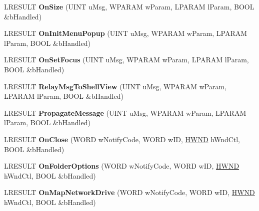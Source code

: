 \begin{DoxyCompactItemize}
\mbox{\label{class_c_shell_browser_a8113e7d49a1ada433d2da04ef61cdff5}} 
L\+R\+E\+S\+U\+LT {\bfseries On\+Size} (U\+I\+NT u\+Msg, W\+P\+A\+R\+AM w\+Param, L\+P\+A\+R\+AM l\+Param, B\+O\+OL \&b\+Handled)
\item 
\mbox{\label{class_c_shell_browser_a6589f68ce060ff00ac2c335e058afdd8}} 
L\+R\+E\+S\+U\+LT {\bfseries On\+Init\+Menu\+Popup} (U\+I\+NT u\+Msg, W\+P\+A\+R\+AM w\+Param, L\+P\+A\+R\+AM l\+Param, B\+O\+OL \&b\+Handled)
\item 
\mbox{\label{class_c_shell_browser_a10d29ee069f0155f98ed3edd4bb272ca}} 
L\+R\+E\+S\+U\+LT {\bfseries On\+Set\+Focus} (U\+I\+NT u\+Msg, W\+P\+A\+R\+AM w\+Param, L\+P\+A\+R\+AM l\+Param, B\+O\+OL \&b\+Handled)
\item 
\mbox{\label{class_c_shell_browser_a0c4efee29288d5938c346fee8cceb997}} 
L\+R\+E\+S\+U\+LT {\bfseries Relay\+Msg\+To\+Shell\+View} (U\+I\+NT u\+Msg, W\+P\+A\+R\+AM w\+Param, L\+P\+A\+R\+AM l\+Param, B\+O\+OL \&b\+Handled)
\item 
\mbox{\label{class_c_shell_browser_a8d00a384e805fb8dcb4e99f5ace18569}} 
L\+R\+E\+S\+U\+LT {\bfseries Propagate\+Message} (U\+I\+NT u\+Msg, W\+P\+A\+R\+AM w\+Param, L\+P\+A\+R\+AM l\+Param, B\+O\+OL \&b\+Handled)
\item 
\mbox{\label{class_c_shell_browser_ab0f76de58d8dcbfe60ca5293dbe931e1}} 
L\+R\+E\+S\+U\+LT {\bfseries On\+Close} (W\+O\+RD w\+Notify\+Code, W\+O\+RD w\+ID, \hyperlink{interfacevoid}{H\+W\+ND} h\+Wnd\+Ctl, B\+O\+OL \&b\+Handled)
\item 
\mbox{\label{class_c_shell_browser_a8fb76ad9cce515012e60bf0eb2da00e6}} 
L\+R\+E\+S\+U\+LT {\bfseries On\+Folder\+Options} (W\+O\+RD w\+Notify\+Code, W\+O\+RD w\+ID, \hyperlink{interfacevoid}{H\+W\+ND} h\+Wnd\+Ctl, B\+O\+OL \&b\+Handled)
\item 
\mbox{\label{class_c_shell_browser_abdfdd664a591d980bad0a349daa01137}} 
L\+R\+E\+S\+U\+LT {\bfseries On\+Map\+Network\+Drive} (W\+O\+RD w\+Notify\+Code, W\+O\+RD w\+ID, \hyperlink{interfacevoid}{H\+W\+ND} h\+Wnd\+Ctl, B\+O\+OL \&b\+Handled)

\end{DoxyCompactItemize}
